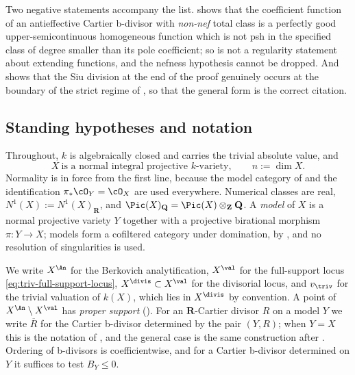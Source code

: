 Two negative statements accompany the list.
 shows that the coefficient function of an
antieffective Cartier b-divisor with \emph{non-nef} total class is a
perfectly good upper-semicontinuous homogeneous function which is not psh
in the specified class of degree smaller than its pole coefficient; so  is not a
regularity statement about extending functions, and the nefness hypothesis
cannot be dropped.  And  shows that the
Siu division at the end of the proof genuinely occurs at the boundary of
the strict regime of , so that the general
form  is the correct citation.

\subsection{Standing hypotheses and notation}
\label{sec:ch38-hypotheses}

Throughout, $k$ is algebraically closed and carries the trivial absolute
value, and
\[
 X\ \text{is a normal integral projective $k$-variety},\qquad
 n:=\dim X .
\tag{38.1}\label{eq:ch38-standing}
\]
Normality is in force from the first line, because the model category of
 and the identification
$\pi_*\cO_Y=\cO_X$ are used everywhere.  Numerical classes are real,
$N^1(X):=N^1(X)_{\mathbf R}$, and $\Pic(X)_{\mathbf Q}
=\Pic(X)\otimes_{\mathbf Z}\mathbf Q$.  A \emph{model} of $X$ is a
normal projective variety $Y$ together with a projective birational
morphism $\pi:Y\to X$; models form a cofiltered category under
domination, by , and no resolution of
singularities is used.

We write $X^{\An}$ for the Berkovich analytification,
$X^{\val}$ for the full-support locus
\eqref{eq:triv-full-support-locus}, $X^{\divis}\subset X^{\val}$ for the
divisorial locus, and $v_{\triv}$ for the trivial valuation of
$k(X)$, which lies in $X^{\divis}$ by convention.  A point of
$X^{\An}\setminus X^{\val}$ has \emph{proper support}
().  For an $\mathbf R$-Cartier divisor
$R$ on a model $Y$ we write $\overline R$ for the Cartier b-divisor
determined by the pair $(Y,R)$; when $Y=X$ this is the notation of
, and the general case is the same construction
after .  Ordering of b-divisors is
coefficientwise, and for a Cartier b-divisor determined on $Y$ it
suffices to test $B_Y\leq0$.


